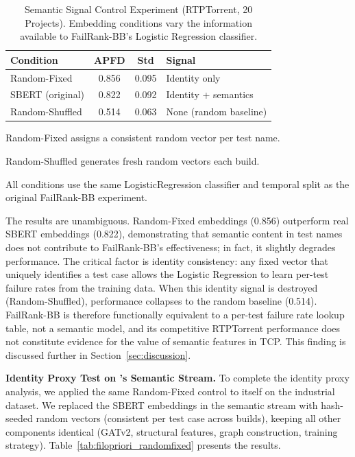\begin{table}[!t]
\centering
\caption{Semantic Signal Control Experiment (RTPTorrent, 20 Projects).
Embedding conditions vary the information available to FailRank-BB's
Logistic Regression classifier.}
\label{tab:semantic_control}
\footnotesize
\begin{tabular}{lccl}
\toprule
\textbf{Condition} & \textbf{APFD} & \textbf{Std} & \textbf{Signal} \\
\midrule
Random-Fixed & 0.856 & 0.095 & Identity only \\
SBERT (original) & 0.822 & 0.092 & Identity + semantics \\
Random-Shuffled & 0.514 & 0.063 & None (random baseline) \\
\bottomrule
\end{tabular}
\begin{tablenotes}
\small
\item Random-Fixed assigns a consistent random vector per test name.
\item Random-Shuffled generates fresh random vectors each build.
\item All conditions use the same LogisticRegression classifier and
temporal split as the original FailRank-BB experiment.
\end{tablenotes}
\end{table}

The results are unambiguous. Random-Fixed embeddings (0.856) outperform
real SBERT embeddings (0.822), demonstrating that semantic content in test
names does not contribute to FailRank-BB's effectiveness; in fact, it
slightly degrades performance. The critical factor is identity
consistency: any fixed vector that uniquely identifies a test case allows
the Logistic Regression to learn per-test failure rates from the training
data. When this identity signal is destroyed (Random-Shuffled), performance
collapses to the random baseline (0.514). FailRank-BB is therefore
functionally equivalent to a per-test failure rate lookup table, not a
semantic model, and its competitive RTPTorrent performance does not
constitute evidence for the value of semantic features in TCP. This finding
is discussed further in Section~\ref{sec:discussion}.

\textbf{Identity Proxy Test on \filopriori{}'s Semantic Stream.}
To complete the identity proxy analysis, we applied the same Random-Fixed
control to \filopriori{} itself on the industrial dataset. We replaced the
SBERT embeddings in the semantic stream with hash-seeded random vectors
(consistent per test case across builds), keeping all other components
identical (GATv2, structural features, graph construction, training
strategy). Table~\ref{tab:filopriori_randomfixed} presents the results.

